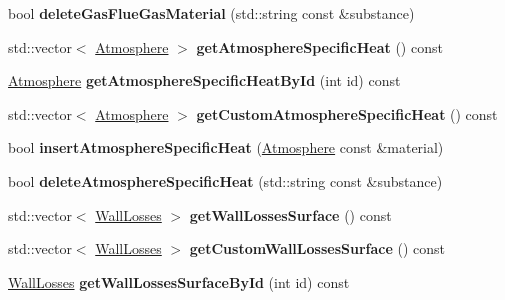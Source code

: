 \begin{DoxyCompactItemize}
\item 
\mbox{\label{class_s_q_lite_a474f1d74a2d0b9f38d474398907fea8d}} 
bool {\bfseries delete\+Gas\+Flue\+Gas\+Material} (std\+::string const \&substance)
\item 
\mbox{\label{class_s_q_lite_a04d22b056b51fb07d192833806eabdfc}} 
std\+::vector$<$ \hyperlink{class_atmosphere}{Atmosphere} $>$ {\bfseries get\+Atmosphere\+Specific\+Heat} () const
\item 
\mbox{\label{class_s_q_lite_ae468835cffed182bb9819299463c53b7}} 
\hyperlink{class_atmosphere}{Atmosphere} {\bfseries get\+Atmosphere\+Specific\+Heat\+By\+Id} (int id) const
\item 
\mbox{\label{class_s_q_lite_adecfb81514a3fa09237baa50b2edf5e7}} 
std\+::vector$<$ \hyperlink{class_atmosphere}{Atmosphere} $>$ {\bfseries get\+Custom\+Atmosphere\+Specific\+Heat} () const
\item 
\mbox{\label{class_s_q_lite_a5be90371486d63abd80668c19682051b}} 
bool {\bfseries insert\+Atmosphere\+Specific\+Heat} (\hyperlink{class_atmosphere}{Atmosphere} const \&material)
\item 
\mbox{\label{class_s_q_lite_a5ad78a89bad17d0e23b59a9c018590f9}} 
bool {\bfseries delete\+Atmosphere\+Specific\+Heat} (std\+::string const \&substance)
\item 
\mbox{\label{class_s_q_lite_ac385b0462588b7a18349d1621ceac57c}} 
std\+::vector$<$ \hyperlink{class_wall_losses}{Wall\+Losses} $>$ {\bfseries get\+Wall\+Losses\+Surface} () const
\item 
\mbox{\label{class_s_q_lite_aaf414f89916731a94d8c81a98d36987d}} 
std\+::vector$<$ \hyperlink{class_wall_losses}{Wall\+Losses} $>$ {\bfseries get\+Custom\+Wall\+Losses\+Surface} () const
\item 
\mbox{\label{class_s_q_lite_a3a7f473d8e23630dae65cd3c3dd7fa97}} 
\hyperlink{class_wall_losses}{Wall\+Losses} {\bfseries get\+Wall\+Losses\+Surface\+By\+Id} (int id) const
\item 
\mbox{\label{class_s_q_lite_a97d510f6f16aa70c61a9dc6a629ad786}} 

\end{DoxyCompactItemize}
